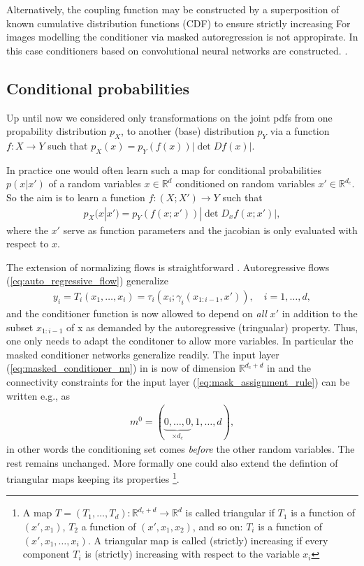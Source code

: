 \documentclass[12pt,a4paper]{article}
\begin{document}
Alternatively, the coupling function may be constructed by a superposition of known cumulative distribution functions (CDF) to ensure strictly increasing  For images modelling the conditioner via masked autoregression is not appropirate. In this case conditioners based on convolutional neural networks are constructed. \cite{ho_2019_flow_pp}. 

\subsection{Conditional probabilities}
Up until now we considered only transformations on the joint pdfs from one propability distribution $p_X$, to another (base) distribution $p_Y$ via a function $f: X\rightarrow Y$ such that $p_X(x) = p_Y(f(x)) |\det Df(x)|$. 


In practice one would often learn such a map for conditional probabilities $p(x|x')$ of a random variables $x\in\mathbb{R}^d$ conditioned on random variables $x' \in \mathbb{R}^{d_c}$. So the aim is to learn a function $f: (X;X') \rightarrow Y$ such that
\begin{align}
p_X(x|x') = p_Y(f(x;x')) |\det D_xf(x;x')| \label{eq:pdf_trafo_inv}, 
\end{align}
where the $x'$ serve as function parameters and the jacobian is only evaluated with respect to $x$.


The extension of normalizing flows is straightforward  
\cite{papamakarios_2017_maf}. Autoregressive flows (\ref{eq:auto_regressive_flow}) generalize
\begin{align} 
y_i =T_i(x_1,\dots, x_i) = \tau_i(x_i; \gamma_i(x_{1:i-1}, x')), \quad i=1,\dots,d, 
\end{align} 
and the conditioner function is now allowed to depend on \textit{all} $x'$ in addition to the subset $x_{1:i-1}$ of x as demanded by the autoregressive (tringualar) property. Thus, one only needs to adapt the conditoner to allow more variables. In particular the masked conditioner networks generalize readily. The input layer (\ref{eq:masked_conditioner_nn}) in is now of dimension $\mathbb{R}^{d_c + d}$ in 
and the connectivity constraints for the input layer (\ref{eq:mask_assignment_rule}) can be written e.g., as 
\begin{align}
	m^0  = (\underbrace{0, \dots, 0}_{\times d_c}, 1, \dots, d),
\end{align}
in other words the conditioning set comes \textit{before} the other random variables. The rest remains unchanged. More formally one could also extend the defintion of triangular maps keeping its properties \footnote{A map $T=(T_1, \dots, T_d): \mathbb{R}^{d_c + d}  \rightarrow \mathbb{R}^d $ is called triangular if $T_1$ is a function of $(x', x_1)$, $T_2$ a function of $(x', x_1, x_2)$, and so on: $T_i$ is a function of $(x', x_1,\dots, x_i)$. A triangular map is called (strictly) increasing if every component $T_i$ is (strictly) increasing with respect to the variable $x_i$}.
\end{document}
